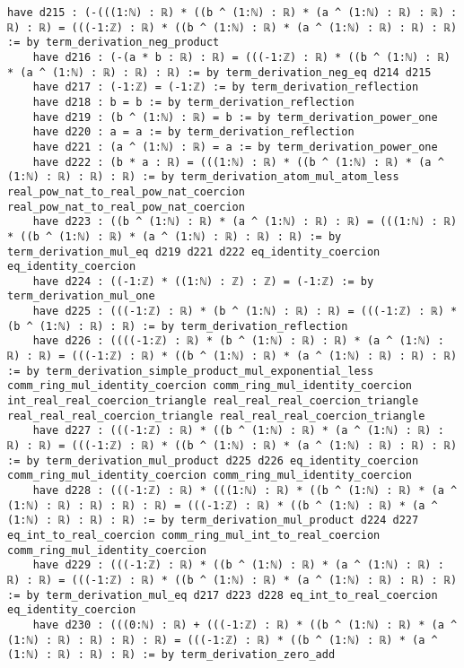 \documentclass{article}
\begin{document}
\begin{tcolorbox}[colback=white!10, width=\linewidth]
\begin{lstlisting}[language=Lean4]
    have d215 : (-(((1:ℕ) : ℝ) * ((b ^ (1:ℕ) : ℝ) * (a ^ (1:ℕ) : ℝ) : ℝ) : ℝ) : ℝ) = (((-1:ℤ) : ℝ) * ((b ^ (1:ℕ) : ℝ) * (a ^ (1:ℕ) : ℝ) : ℝ) : ℝ) := by term_derivation_neg_product
    have d216 : (-(a * b : ℝ) : ℝ) = (((-1:ℤ) : ℝ) * ((b ^ (1:ℕ) : ℝ) * (a ^ (1:ℕ) : ℝ) : ℝ) : ℝ) := by term_derivation_neg_eq d214 d215
    have d217 : (-1:ℤ) = (-1:ℤ) := by term_derivation_reflection
    have d218 : b = b := by term_derivation_reflection
    have d219 : (b ^ (1:ℕ) : ℝ) = b := by term_derivation_power_one
    have d220 : a = a := by term_derivation_reflection
    have d221 : (a ^ (1:ℕ) : ℝ) = a := by term_derivation_power_one
    have d222 : (b * a : ℝ) = (((1:ℕ) : ℝ) * ((b ^ (1:ℕ) : ℝ) * (a ^ (1:ℕ) : ℝ) : ℝ) : ℝ) := by term_derivation_atom_mul_atom_less real_pow_nat_to_real_pow_nat_coercion real_pow_nat_to_real_pow_nat_coercion
    have d223 : ((b ^ (1:ℕ) : ℝ) * (a ^ (1:ℕ) : ℝ) : ℝ) = (((1:ℕ) : ℝ) * ((b ^ (1:ℕ) : ℝ) * (a ^ (1:ℕ) : ℝ) : ℝ) : ℝ) := by term_derivation_mul_eq d219 d221 d222 eq_identity_coercion eq_identity_coercion
    have d224 : ((-1:ℤ) * ((1:ℕ) : ℤ) : ℤ) = (-1:ℤ) := by term_derivation_mul_one
    have d225 : (((-1:ℤ) : ℝ) * (b ^ (1:ℕ) : ℝ) : ℝ) = (((-1:ℤ) : ℝ) * (b ^ (1:ℕ) : ℝ) : ℝ) := by term_derivation_reflection
    have d226 : ((((-1:ℤ) : ℝ) * (b ^ (1:ℕ) : ℝ) : ℝ) * (a ^ (1:ℕ) : ℝ) : ℝ) = (((-1:ℤ) : ℝ) * ((b ^ (1:ℕ) : ℝ) * (a ^ (1:ℕ) : ℝ) : ℝ) : ℝ) := by term_derivation_simple_product_mul_exponential_less comm_ring_mul_identity_coercion comm_ring_mul_identity_coercion int_real_real_coercion_triangle real_real_real_coercion_triangle real_real_real_coercion_triangle real_real_real_coercion_triangle
    have d227 : (((-1:ℤ) : ℝ) * ((b ^ (1:ℕ) : ℝ) * (a ^ (1:ℕ) : ℝ) : ℝ) : ℝ) = (((-1:ℤ) : ℝ) * ((b ^ (1:ℕ) : ℝ) * (a ^ (1:ℕ) : ℝ) : ℝ) : ℝ) := by term_derivation_mul_product d225 d226 eq_identity_coercion comm_ring_mul_identity_coercion comm_ring_mul_identity_coercion
    have d228 : (((-1:ℤ) : ℝ) * (((1:ℕ) : ℝ) * ((b ^ (1:ℕ) : ℝ) * (a ^ (1:ℕ) : ℝ) : ℝ) : ℝ) : ℝ) = (((-1:ℤ) : ℝ) * ((b ^ (1:ℕ) : ℝ) * (a ^ (1:ℕ) : ℝ) : ℝ) : ℝ) := by term_derivation_mul_product d224 d227 eq_int_to_real_coercion comm_ring_mul_int_to_real_coercion comm_ring_mul_identity_coercion
    have d229 : (((-1:ℤ) : ℝ) * ((b ^ (1:ℕ) : ℝ) * (a ^ (1:ℕ) : ℝ) : ℝ) : ℝ) = (((-1:ℤ) : ℝ) * ((b ^ (1:ℕ) : ℝ) * (a ^ (1:ℕ) : ℝ) : ℝ) : ℝ) := by term_derivation_mul_eq d217 d223 d228 eq_int_to_real_coercion eq_identity_coercion
    have d230 : (((0:ℕ) : ℝ) + (((-1:ℤ) : ℝ) * ((b ^ (1:ℕ) : ℝ) * (a ^ (1:ℕ) : ℝ) : ℝ) : ℝ) : ℝ) = (((-1:ℤ) : ℝ) * ((b ^ (1:ℕ) : ℝ) * (a ^ (1:ℕ) : ℝ) : ℝ) : ℝ) := by term_derivation_zero_add

\end{lstlisting}
\end{tcolorbox}
\end{document}
